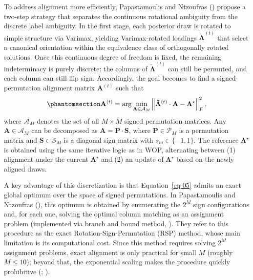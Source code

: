 \documentclass[
  man,
  longtable,
  nolmodern,
  notxfonts,
  notimes,
  colorlinks=true,linkcolor=blue,citecolor=blue,urlcolor=blue]{apa7}
\theoremstyle{plain}
\theoremstyle{plain}
\theoremstyle{remark}
\begin{document}
To address alignment more efficiently, Papastamoulis and Ntzoufras
() propose a
two-step strategy that separates the continuous rotational ambiguity
from the discrete label ambiguity. In the first stage, each posterior
draw is rotated to simple structure via Varimax, yielding
Varimax-rotated loadings \(\tilde{\mathbf\Lambda}^{(t)}\) that select a
canonical orientation within the equivalence class of orthogonally
rotated solutions. Once this continuous degree of freedom is fixed, the
remaining indeterminacy is purely discrete: the columns of
\(\tilde{\mathbf\Lambda}^{(t)}\) can still be permuted, and each column
can still flip sign. Accordingly, the goal becomes to find a
signed-permutation alignment matrix \(\mathbf{A}^{(t)}\) such that
\begin{equation}\phantomsection\label{eq-05}{
\mathbf{A}^{(t)} = \arg\min_{\mathbf{A}\in\mathcal{A}_M}\left\|\mathbf{\tilde\Lambda}^{(t)}\cdot\mathbf{A} - \mathbf{\Lambda}^\star\right\|^2_F,
}\end{equation} where \(\mathcal{A}_M\) denotes the set of all
\(M\times M\) signed permutation matrices. Any
\(\mathbf{A}\in\mathcal{A}_M\) can be decomposed as
\(\mathbf{A}=\mathbf{P}\cdot\mathbf{S}\), where
\(\mathbf{P}\in\mathcal{P}_M\) is a permutation matrix and
\(\mathbf{S}\in\mathcal{S}_M\) is a diagonal sign matrix with
\(s_m\in\{-1,1\}\). The reference \(\mathbf{\Lambda}^\star\) is obtained
using the same iterative logic as in WOP, alternating between (1)
alignment under the current \(\mathbf{\Lambda}^\star\) and (2) an update
of \(\mathbf{\Lambda}^\star\) based on the newly aligned draws.

A key advantage of this discretization is that Equation~\ref{eq-05}
admits an exact global optimum over the space of signed permutations. In
Papastamoulis and Ntzoufras
(), this optimum is
obtained by enumerating the \(2^M\) sign configurations and, for each
one, solving the optimal column matching as an assignment problem
(implemented via branch and bound method,
). They refer to this
procedure as the exact Rotation-Sign-Permutation (RSP) method, whose
main limitation is its computational cost. Since this method requires
solving \(2^M\) assignment problems, exact alignment is only practical
for small \(M\) (roughly \(M\leq 10\)); beyond that, the exponential
scaling makes the procedure quickly prohibitive
(; ).
\end{document}

